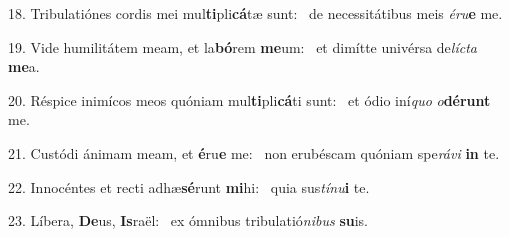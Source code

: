 18. Tribulatiónes cordis mei mul\textbf{ti}pli\textbf{cá}tæ sunt: \ast\  de necessitátibus meis \textit{é}\textit{ru}\textbf{e} me.\

19. Vide humilitátem meam, et la\textbf{bó}rem \textbf{me}um: \ast\  et dimítte univérsa de\textit{líc}\textit{ta} \textbf{me}a.\

20. Réspice inimícos meos quóniam mul\textbf{ti}pli\textbf{cá}ti sunt: \ast\  et ódio iní\textit{quo} \textit{o}\textbf{dé}\textbf{runt} me.\

21. Custódi ánimam meam, et \textbf{é}ru\textbf{e} me: \ast\  non erubéscam quóniam spe\textit{rá}\textit{vi} \textbf{in} te.\

22. Innocéntes et recti adhæ\textbf{sé}runt \textbf{mi}hi: \ast\  quia sus\textit{tí}\textit{nu}\textbf{i} te.\

23. Líbera, \textbf{De}us, \textbf{Is}raël: \ast\  ex ómnibus tribulatió\textit{ni}\textit{bus} \textbf{su}is.\

